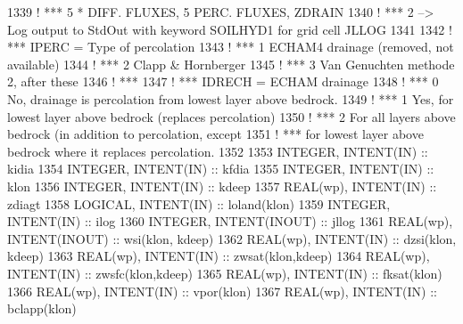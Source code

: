 \begin{DoxyCode}
1339 \textcolor{comment}{!     ***                5 * DIFF. FLUXES, 5 PERC. FLUXES, ZDRAIN}
1340 \textcolor{comment}{!     ***          2 --> Log output to StdOut with keyword SOILHYD1 for grid cell JLLOG}
1341 
1342 \textcolor{comment}{!     ***  IPERC = Type of percolation}
1343 \textcolor{comment}{!     ***          1  ECHAM4 drainage (removed, not available)}
1344 \textcolor{comment}{!     ***          2  Clapp & Hornberger}
1345 \textcolor{comment}{!     ***          3  Van Genuchten methode 2, after these}
1346 \textcolor{comment}{!     ***}
1347 \textcolor{comment}{!     ***  IDRECH = ECHAM drainage}
1348 \textcolor{comment}{!     ***          0   No, drainage is percolation from lowest layer above bedrock.}
1349 \textcolor{comment}{!     ***          1   Yes, for lowest layer above bedrock (replaces percolation)}
1350 \textcolor{comment}{!     ***          2   For all layers above bedrock (in addition to percolation, except}
1351 \textcolor{comment}{!     ***              for lowest layer above bedrock where it replaces percolation.}
1352 
1353 \textcolor{keywordtype}{INTEGER},  \textcolor{keywordtype}{INTENT(IN)}                     :: kidia
1354 \textcolor{keywordtype}{INTEGER},  \textcolor{keywordtype}{INTENT(IN)}                     :: kfdia
1355 \textcolor{keywordtype}{INTEGER},  \textcolor{keywordtype}{INTENT(IN)}                     :: klon
1356 \textcolor{keywordtype}{INTEGER},  \textcolor{keywordtype}{INTENT(IN)}                     :: kdeep
1357 \textcolor{keywordtype}{REAL(wp)}, \textcolor{keywordtype}{INTENT(IN)}                     :: zdiagt
1358 \textcolor{keywordtype}{LOGICAL},  \textcolor{keywordtype}{INTENT(IN)}                     :: loland(klon)
1359 \textcolor{keywordtype}{INTEGER},  \textcolor{keywordtype}{INTENT(IN)}                     :: ilog
1360 \textcolor{keywordtype}{INTEGER},  \textcolor{keywordtype}{INTENT(INOUT)}                  :: jllog
1361 \textcolor{keywordtype}{REAL(wp)}, \textcolor{keywordtype}{INTENT(INOUT)}                  :: wsi(klon, kdeep)
1362 \textcolor{keywordtype}{REAL(wp)}, \textcolor{keywordtype}{INTENT(IN)}                     :: dzsi(klon, kdeep)
1363 \textcolor{keywordtype}{REAL(wp)}, \textcolor{keywordtype}{INTENT(IN)}                     :: zwsat(klon,kdeep)
1364 \textcolor{keywordtype}{REAL(wp)}, \textcolor{keywordtype}{INTENT(IN)}                     :: zwsfc(klon,kdeep)
1365 \textcolor{keywordtype}{REAL(wp)}, \textcolor{keywordtype}{INTENT(IN)}                     :: fksat(klon)
1366 \textcolor{keywordtype}{REAL(wp)}, \textcolor{keywordtype}{INTENT(IN)}                     :: vpor(klon)
1367 \textcolor{keywordtype}{REAL(wp)}, \textcolor{keywordtype}{INTENT(IN)}                     :: bclapp(klon)

\end{DoxyCode}
